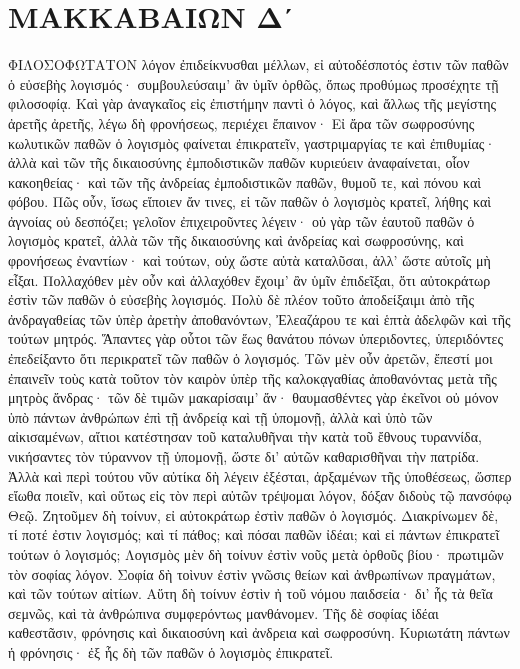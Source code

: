 \section{ΜΑΚΚΑΒΑΙΩΝ Δʹ}
ΦΙΛΟΣΟΦΩΤΑΤΟΝ λόγον ἐπιδείκνυσθαι μέλλων, εἰ αὐτοδέσποτός ἐστιν τῶν παθῶν ὁ εὐσεβὴς λογισμός· συμβουλεύσαιμ' ἂν ὑμῖν ὀρθῶς, ὅπως προθύμως προσέχητε τῇ φιλοσοφίᾳ. 
Καὶ γὰρ ἀναγκαῖος εἰς ἐπιστήμην παντὶ ὁ λόγος, καὶ ἄλλως τῆς μεγίστης ἀρετῆς ἀρετῆς, λέγω δὴ φρονήσεως, περιέχει ἔπαινον· 
Εἰ ἄρα τῶν σωφροσύνης κωλυτικῶν παθῶν ὁ λογισμὸς φαίνεται ἐπικρατεῖν, γαστριμαργίας τε καὶ ἐπιθυμίας· 
ἀλλὰ καὶ τῶν τῆς δικαιοσύνης ἐμποδιστικῶν παθῶν κυριεύειν ἀναφαίνεται, οἷον κακοηθείας· καὶ τῶν τῆς ἀνδρείας ἐμποδιστικῶν παθῶν, θυμοῦ τε, καὶ πόνου καὶ φόβου. 
Πῶς οὖν, ἴσως εἴποιεν ἄν τινες, εἰ τῶν παθῶν ὁ λογισμὸς κρατεῖ, λήθης καὶ ἀγνοίας οὐ δεσπόζει; 
γελοῖον ἐπιχειροῦντες λέγειν· οὐ γὰρ τῶν ἑαυτοῦ παθῶν ὁ λογισμὸς κρατεῖ, ἀλλὰ τῶν τῆς δικαιοσύνης καὶ ἀνδρείας καὶ σωφροσύνης, καὶ φρονήσεως ἐναντίων· καὶ τούτων, οὐχ ὥστε αὐτὰ καταλῦσαι, ἀλλ' ὥστε αὐτοῖς μὴ εἶξαι. 
Πολλαχόθεν μὲν οὖν καὶ ἀλλαχόθεν ἔχοιμ' ἂν ὑμῖν ἐπιδεῖξαι, ὅτι αὐτοκράτωρ ἐστὶν τῶν παθῶν ὁ εὐσεβὴς λογισμός. 
Πολὺ δὲ πλέον τοῦτο ἀποδείξαιμι ἀπὸ τῆς ἀνδραγαθείας τῶν ὑπὲρ ἀρετὴν ἀποθανόντων, Ἐλεαζάρου τε καὶ ἑπτὰ ἀδελφῶν καὶ τῆς τούτων μητρός. 
Ἅπαντες γὰρ οὗτοι τῶν ἕως θανάτου πόνων ὑπεριδοντες, ὑπεριδόντες ἐπεδείξαντο ὅτι περικρατεῖ τῶν παθῶν ὁ λογισμός. 
Τῶν μὲν οὖν ἀρετῶν, ἔπεστί μοι ἐπαινεῖν τοὺς κατὰ τοῦτον τὸν καιρὸν ὑπὲρ τῆς καλοκᾳγαθίας ἀποθανόντας μετὰ τῆς μητρὸς ἄνδρας· 
τῶν δὲ τιμῶν μακαρίσαιμ' ἄν· θαυμασθέντες γὰρ ἐκεῖνοι οὐ μόνον ὑπὸ πάντων ἀνθρώπων ἐπὶ τῇ ἀνδρείᾳ καὶ τῇ ὑπομονῇ, ἀλλὰ καὶ ὑπὸ τῶν αἰκισαμένων, αἴτιοι κατέστησαν τοῦ καταλυθῆναι τὴν κατὰ τοῦ ἔθνους τυραννίδα, νικήσαντες τὸν τύραννον τῇ ὑπομονῇ, ὥστε δι' αὐτῶν καθαρισθῆναι τὴν πατρίδα. 
Ἀλλὰ καὶ περὶ τούτου νῦν αὐτίκα δὴ λέγειν ἐξέσται, ἀρξαμένων τῆς ὑποθέσεως, ὥσπερ εἴωθα ποιεῖν, καὶ οὕτως εἰς τὸν περὶ αὐτῶν τρέψομαι λόγον, δόξαν διδοὺς τῷ πανσόφῳ Θεῷ. 
Ζητοῦμεν δὴ τοίνυν, εἰ αὐτοκράτωρ ἐστὶν παθῶν ὁ λογισμός. 
Διακρίνωμεν δὲ, τί ποτέ ἐστιν λογισμός; καὶ τί πάθος; καὶ πόσαι παθῶν ἰδέαι; καὶ εἰ πάντων ἐπικρατεῖ τούτων ὁ λογισμός; 
Λογισμὸς μὲν δὴ τοίνυν ἐστὶν νοῦς μετὰ ὀρθοῦς βίου· πρωτιμῶν τὸν σοφίας λόγον. 
Σοφία δὴ τοὶνυν ἐστὶν γνῶσις θείων καὶ ἀνθρωπίνων πραγμάτων, καὶ τῶν τούτων αἰτίων. 
Αὕτη δὴ τοίνυν ἐστὶν ἠ τοῦ νόμου παιδσεία· δι' ἧς τὰ θεῖα σεμνῶς, καὶ τὰ ἀνθρώπινα συμφερόντως μανθάνομεν. 
Τῆς δὲ σοφίας ἰδέαι καθεστᾶσιν, φρόνησις καὶ δικαιοσύνη καὶ ἀνδρεια καὶ σωφροσύνη. 
Κυριωτάτη πάντων ἡ φρόνησις· ἐξ ἧς δὴ τῶν παθῶν ὁ λογισμὸς ἐπικρατεῖ. 
